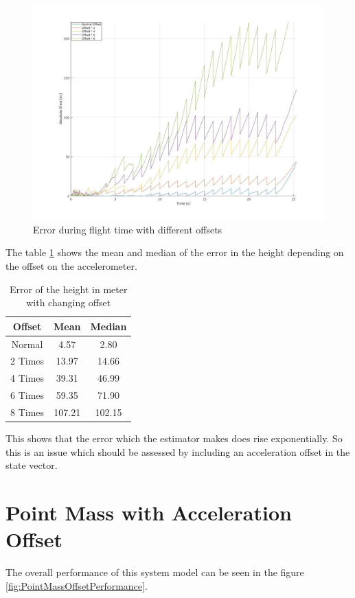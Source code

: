 \begin{figure}[h!]
 \centering
 \includegraphics[width=.8\textwidth]{./Pictures/PointMassErrorWithOffset.jpg}
 \caption{Error during flight time with different offsets}
 \label{fig:PointMassErrorWithOffset}
\end{figure}


The table \ref{tab:PointMassPerformanceWithOffset} shows the mean and median of the error in the height depending on the offset on the accelerometer.

\begin{table}[h!]
\centering
\begin{tabular}{ccc}
\hline
\multicolumn{1}{|c|}{Offset} & \multicolumn{1}{|c|}{Mean}& \multicolumn{1}{|c|}{Median} \\ \hline
%
Normal & 4.57 & 2.80\\
2 Times & 13.97 & 14.66\\
4 Times & 39.31 & 46.99\\
6 Times & 59.35 & 71.90\\
8 Times & 107.21 & 102.15
\end{tabular}
\caption{Error of the height in meter with changing offset}
\label{tab:PointMassPerformanceWithOffset}
\end{table}

This shows that the error which the estimator makes does rise exponentially.
So this is an issue which should be assessed by including an acceleration offset in the state vector.


\newpage
\section{Point Mass with Acceleration Offset}
The overall performance of this system model can be seen in the figure \ref{fig:PointMassOffsetPerformance}.

